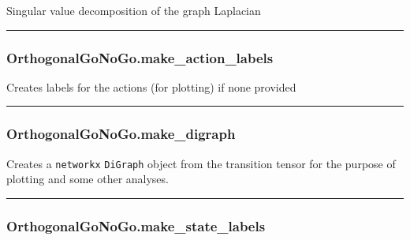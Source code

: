 \begin{Shaded}
\begin{Highlighting}[]
\NormalTok{)}
\end{Highlighting}
\end{Shaded}

Singular value decomposition of the graph Laplacian

\begin{center}\rule{0.5\linewidth}{\linethickness}\end{center}

\subsubsection{OrthogonalGoNoGo.make\_action\_labels}\label{orthogonalgonogo.make_action_labels}

\begin{Shaded}
\begin{Highlighting}[]
\NormalTok{)}
\end{Highlighting}
\end{Shaded}

Creates labels for the actions (for plotting) if none provided

\begin{center}\rule{0.5\linewidth}{\linethickness}\end{center}

\subsubsection{OrthogonalGoNoGo.make\_digraph}\label{orthogonalgonogo.make_digraph}

\begin{Shaded}
\begin{Highlighting}[]
\NormalTok{)}
\end{Highlighting}
\end{Shaded}

Creates a \texttt{networkx} \texttt{DiGraph} object from the transition
tensor for the purpose of plotting and some other analyses.

\begin{center}\rule{0.5\linewidth}{\linethickness}\end{center}

\subsubsection{OrthogonalGoNoGo.make\_state\_labels}\label{orthogonalgonogo.make_state_labels}

